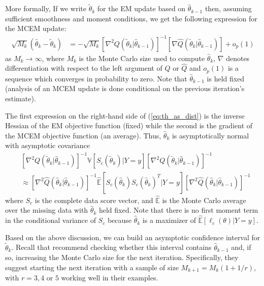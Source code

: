\documentclass[11pt, oneside]{article}   	%
\newcommand{\bV}{\mathbb{V}}
\newcommand{\bE}{\mathbb{E}}
\newcommand{\hq}{\hat{Q}}
\begin{document}
More formally, If we write $\tilde{\theta}_k$ for the EM update based on $\hat{\theta}_{k-1}$ then, assuming sufficient smoothness and moment conditions, we get the following expression for the MCEM update:
%
\begin{align}
    \sqrt{M_k}(\hat{\theta}_k - \tilde{\theta}_k) &= - \sqrt{M_k} \left[ \nabla^2 Q(\tilde{\theta}_k|\hat{\theta}_{k-1})\right]^{-1} \left[\nabla \hq(\tilde{\theta}_k|\hat{\theta}_{k-1}) \right] + o_p(1) \label{eq:th_as_dist}
\end{align}
%
as $M_k \rightarrow \infty$, where $M_k$ is the Monte Carlo size used to compute $\hat{\theta}_k$, $\nabla$ denotes differentiation with respect to the left argument of $Q$ or $\hat{Q}$ and $o_p(1)$ is a sequence which converges in probability to zero. Note that $\hat{\theta}_{k-1}$ is held fixed (analysis of an MCEM update is done conditional on the previous iteration's estimate). 
%

The first expression on the right-hand side of (\ref{eq:th_as_dist}) is the inverse Hessian of the EM objective function (fixed) while the second is the gradient of the MCEM objective function (an average). Thus, $\hat{\theta}_k$ is asymptotically normal with asymptotic covariance
%
\begin{align}
    &\left[ \nabla^2 Q(\tilde{\theta}_k|\hat{\theta}_{k-1})\right]^{-1} \bV \left[ S_c (\tilde{\theta}_k) | Y=y \right] \left[ \nabla^2 Q(\tilde{\theta}_k|\hat{\theta}_{k-1})\right]^{-1}\\
    &\approx \left[ \nabla^2 \hat{Q}(\hat{\theta}_k|\hat{\theta}_{k-1})\right]^{-1} \hat{\bE} \left[ S_c(\hat{\theta}_k) S_c(\hat{\theta}_k)^T | Y=y \right] \left[ \nabla^2 \hat{Q}(\hat{\theta}_k|\hat{\theta}_{k-1})\right]^{-1} 
\end{align}
%
where $S_c$ is the complete data score vector, and $\hat{\bE}$ is the Monte Carlo average over the missing data with $\hat{\theta}_k$ held fixed. Note that there is no first moment term in the conditional variance of $S_c$ because $\hat{\theta}_k$ is a maximizer of $\hat{\bE} [\ell_c (\theta) |Y=y]$.

Based on the above discussion, we can build an asymptotic confidence interval for $\tilde{\theta}_k$. Recall that \citeauthor{Boo99} recommend checking whether this interval contains $\hat{\theta}_{k-1}$ and, if so, increasing the Monte Carlo size for the next iteration. Specifically, they suggest starting the next iteration with a sample of size $M_{k+1} = M_k ( 1 + 1/r)$, with $r = 3,4$ or $5$ working well in their examples.
\end{document}
